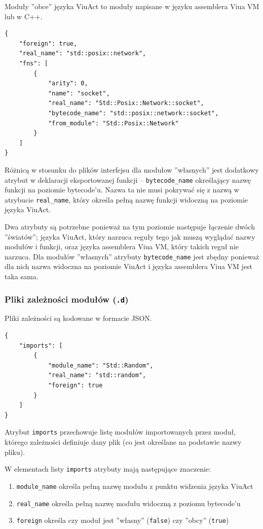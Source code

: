 \documentclass[11pt,oneside,a4paper,titlepage,onecolumn]{article}
\begin{document}
Moduły ''obce'' języka ViuAct to moduły napisane w języku assemblera Viua VM lub w C++.

\begin{lstlisting}
{
    "foreign": true,
    "real_name": "std::posix::network",
    "fns": [
        {
            "arity": 0,
            "name": "socket",
            "real_name": "Std::Posix::Network::socket",
            "bytecode_name": "std::posix::network::socket",
            "from_module": "Std::Posix::Network"
        }
    ]
}
\end{lstlisting}

Różnicą w stosunku do plików interfejsu dla modułow ''własnych'' jest dodatkowy atrybut w deklaracji
eksportowanej funkcji -- \texttt{bytecode\_name} określający nazwę funkcji na poziomie bytecode'u. Nazwa ta
nie musi pokrywać się z nazwą w atrybucie \texttt{real\_name}, który określa pełną nazwę funkcji widoczną na
poziomie języka ViuAct.

Dwa atrybuty są potrzebne ponieważ na tym poziomie następuje łączenie dwóch ''światów''; języka ViuAct, który
narzuca reguły tego jak muszą wyglądać nazwy modułów i funkcji, oraz języka assemblera Viua VM, który takich
reguł nie narzuca. Dla modułów ''własnych'' atrybuty \texttt{bytecode\_name} jest zbędny ponieważ dla nich
nazwa widoczna na poziomie ViuAct i języka assemblera Viua VM jest taka sama.

\subsubsection{Pliki zależności modułów (\texttt{.d})}
\label{pliki_zaleznosci_modulow}

Pliki zależności są kodowane w formacie JSON.

\begin{lstlisting}
{
    "imports": [
        {
            "module_name": "Std::Random",
            "real_name": "std::random",
            "foreign": true
        }
    ]
}
\end{lstlisting}

Atrybut \texttt{imports} przechowuje listę modułów importowanych przez moduł, którego zależności definiuje
dany plik (co jest określane na podstawie nazwy pliku).

W elementach listy \texttt{imports} atrybuty mają następujące znaczenie:

\begin{enumerate}
    \item \texttt{module\_name} określa pełną nazwę modułu z punktu widzenia języka ViuAct
    \item \texttt{real\_name} określa pełną nazwę modułu widoczną z poziomu bytecode'u
    \item \texttt{foreign} określa czy moduł jest ''własny'' (\texttt{false}) czy ''obcy'' (\texttt{true})
\end{enumerate}
\end{document}
